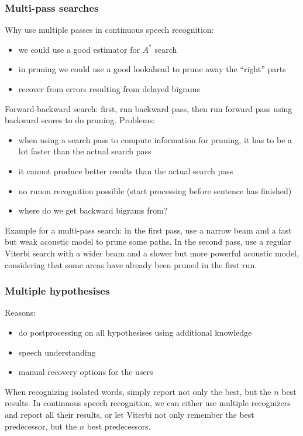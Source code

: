 \vspace{10pt}

\subsubsection{Multi-pass searches}
Why use multiple passes in continuous speech recognition:
\begin{itemize}
    \item we could use a good estimator for $A^{\ast}$ search
    \item in pruning we could use a good lookahead to prune away the ``right'' parts
    \item recover from errors resulting from delayed bigrams
\end{itemize}
Forward-backward search: first, run backward pass, then run forward pass using backward scores to do pruning. Problems:
\begin{itemize}
    \item when using a search pass to compute information for pruning, it has to be a lot faster than the actual search pass
    \item it cannot produce better results than the actual search pass
    \item no runon recognition possible (start processing before sentence has finished)
    \item where do we get backward bigrams from?
\end{itemize}
Example for a multi-pass search: in the first pass, use a narrow beam and a fast but weak acoustic model to prune some paths. In the second pass, use a regular Viterbi search with a wider beam and a slower but more powerful acoustic model, considering that some areas have already been pruned in the first run.

\subsubsection{Multiple hypothesises}
Reasons:
\begin{itemize}
    \item do postprocessing on all hypothesises using additional knowledge
    \item speech understanding
    \item manual recovery options for the users
\end{itemize}
When recognizing isolated words, simply report not only the best, but the $n$ best results. In continuous speech recognition, we can either use multiple recognizers and report all their results, or let Viterbi not only remember the best predecessor, but the $n$ best predecessors.

